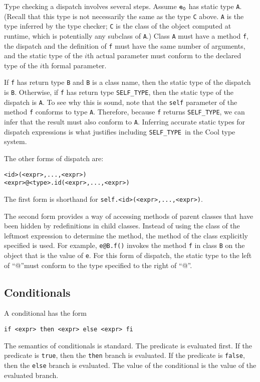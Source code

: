 \documentclass[11pt]{article}
\newcommand{\styp}{{\tt SELF\_TYPE}}
\begin{document}
Type checking a dispatch involves several steps.  Assume $\tt e_0$ has
static type {\tt A}.  (Recall that this type is not necessarily the
same as the type {\tt C} above.  {\tt A} is the type inferred by the
type checker; {\tt C} is the class of the object computed at runtime,
which is potentially any subclass of {\tt A}.)  Class {\tt A} must
have a method {\tt f}, the dispatch and the definition of {\tt f} must
have the same number of arguments, and the static type of the $i$th actual
parameter must conform to the declared type of the $i$th formal
parameter.

If {\tt f} has return type {\tt B} and {\tt B} is a class name, then
the static type of the dispatch is {\tt B}.  Otherwise, if {\tt f} has
return type \styp, then the static type of the dispatch is {\tt A}. To see
why this is sound, note that the {\tt self} parameter of the method {\tt f}
conforms to type {\tt A}.  Therefore, because {\tt f} returns \styp,
we can infer that the result must also conform to {\tt A}.  Inferring
accurate static types for dispatch expressions is what justifies including
\styp\ in the Cool type system.


The other forms of dispatch are:
\begin{verbatim}
<id>(<expr>,...,<expr>)
<expr>@<type>.id(<expr>,...,<expr>)
\end{verbatim}
The first form is shorthand for {\tt self.<id>(<expr>,...,<expr>)}.

The second form  provides a way of accessing methods of parent classes 
that have been hidden by redefinitions in child classes.
Instead of using the class of the leftmost expression
to determine the method, the method of the class explicitly specified is
used.  For example, {\tt e@B.f()} invokes the method {\tt f} in
class {\tt B} on the object that is the value of {\tt e}.  For this form
of dispatch, the static type to the left of ``@''must conform to the
type specified to the right of ``@''.

\subsection{Conditionals}
\label{sec-cond}

A conditional has the form
\begin{verbatim}
if <expr> then <expr> else <expr> fi
\end{verbatim}

The semantics of conditionals is standard.  The predicate is evaluated
first.  If the predicate is {\tt true}, then the {\tt then} branch is
evaluated.  If the predicate is {\tt false}, then the {\tt else} branch is
evaluated.  The value of the conditional is the value of the evaluated branch.
\end{document}
